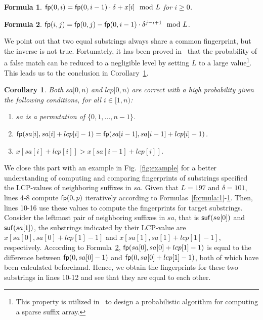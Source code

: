 \documentclass[10pt,journal,compsoc]{IEEEtran}
\newtheorem{Formula}{Formula}
\newtheorem{Corollary}{Corollary}
\begin{document}
\begin{Formula} \label{formula:2}	
	${\sf fp}(0, i) = {\sf fp}(0, i - 1) \cdot {\delta} + x[i]\mod L$ for $i \ge 0$.
	
\end{Formula}

\begin{Formula} \label{formula:3}
	${\sf fp}(i, j) = {\sf fp}(0, j) - {\sf fp}(0 ,i - 1) \cdot {\delta}^{j - i + 1}\mod L$.
	
\end{Formula}

We point out that two equal substrings always share a common fingerprint, but the inverse is not true. Fortunately, it has been proved in~\cite{Karp1987} that the probability of a false match can be reduced to a negligible level by setting $L$ to a large value\footnote{This property is utilized in~\cite{Bille2013} to design a probabilistic algorithm for computing a sparse suffix array. }. This leads us to the conclusion in Corollary~\ref{corollary:1}.

\begin{Corollary} \label{corollary:1}
	Both $sa[0, n)$ and $lcp[0, n)$ are correct with a high probability given the following conditions, for all $i \in [1, n)$:
	
	\begin{enumerate}[(1)]
		\item
		$sa$ is a permutation of $\{0, 1, \dots, n - 1\}$.
		
		\item
		${\sf fp}(sa[i], sa[i] + lcp[i] - 1) = {\sf fp}(sa[i - 1], sa[i - 1] + lcp[i] - 1)$.
		
		\item
		$x[sa[i] + lcp[i]] > x[sa[i - 1] + lcp[i]]$.
	\end{enumerate}
\end{Corollary}

We close this part with an example in Fig.~\ref{fig:example} for a better understanding of computing and comparing fingerprints of substrings specified the LCP-values of neighboring suffixes in $sa$. Given that $L = 197$ and $\delta = 101$, lines 4-8 compute ${\sf fp}(0, p)$ iteratively according to Formulas~\ref{formula:1}-\ref{formula:2}. Then, lines 10-16 use these values to compute the fingerprints for target substrings. Consider the leftmost pair of neighboring suffixes in $sa$, that is ${\sf suf}(sa[0])$ and ${\sf suf}(sa[1])$, the substrings indicated by their LCP-value are $x[sa[0], sa[0] + lcp[1] - 1]$ and $x[sa[1], sa[1] + lcp[1] - 1]$, respectively. According to Formula~\ref{formula:3}, ${\sf fp}(sa[0], sa[0] + lcp[1] - 1)$ is equal to the difference between ${\sf fp}(0, sa[0] - 1)$ and ${\sf fp}(0, sa[0] + lcp[1] - 1)$, both of which have been calculated beforehand. Hence, we obtain the fingerprints for these two substrings in lines 10-12 and see that they are equal to each other. 
\end{document}
